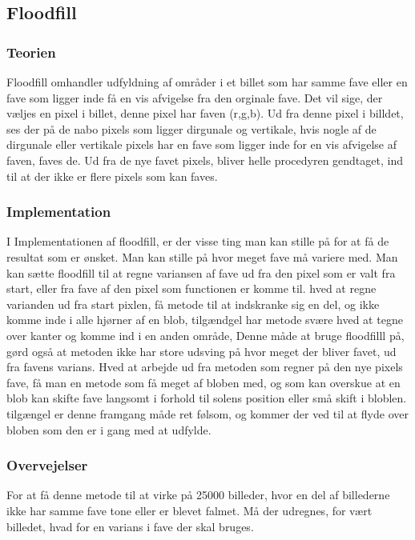 \subsection*{Floodfill}

\subsubsection*{Teorien}
Floodfill omhandler udfyldning af områder i et billet som har samme fave eller en fave som ligger inde få en vis afvigelse fra den orginale fave. Det vil sige, der væljes en pixel i billet, denne pixel har faven (r,g,b). Ud fra denne pixel i billdet, ses der på de nabo pixels som ligger dirgunale og vertikale, hvis nogle af de dirgunale eller vertikale pixels har en fave som ligger inde for en vis afvigelse af faven, faves de. Ud fra de nye favet pixels, bliver helle procedyren gendtaget, ind til at der ikke er flere pixels som kan faves.

\subsubsection*{Implementation}
I Implementationen af floodfill, er der visse ting man kan stille på for at få de resultat som er ønsket. Man kan stille på hvor meget fave må variere med. Man kan sætte floodfill til at regne variansen af fave ud fra den pixel som er valt fra start, eller fra fave af den pixel som functionen er komme til. hved at regne varianden ud fra start pixlen, få metode til at indskranke sig en del, og ikke komme inde i alle hjørner af en blob, tilgændgel har metode svære hved at tegne over kanter og komme ind i en anden område, Denne måde at bruge floodfilll på, gørd også at metoden ikke har store udsving på hvor meget der bliver favet, ud fra favens varians. Hved at arbejde ud fra metoden som regner på den nye pixels fave, få man en metode som få meget af bloben med, og som kan overskue at en blob kan skifte fave langsomt i forhold til solens position eller små skift i bloblen. tilgængel er denne framgang måde ret følsom, og kommer der ved til at flyde over bloben som den er i gang med at udfylde.  

\subsubsection*{Overvejelser}
For at få denne metode til at virke på 25000 billeder, hvor en del af billederne ikke har samme fave tone eller er blevet falmet. Må der udregnes, for vært billedet, hvad for en varians i fave der skal bruges.
